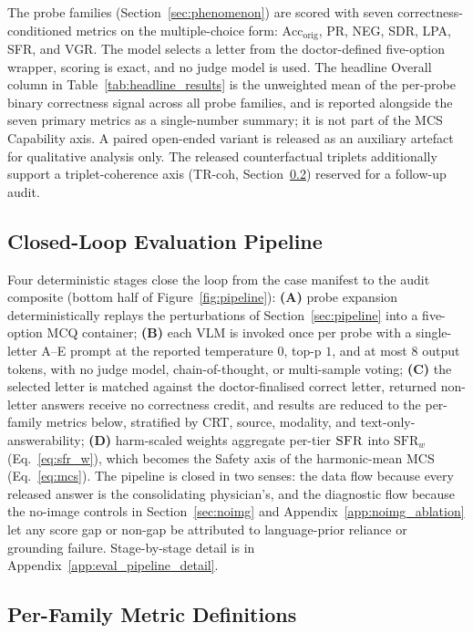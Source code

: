 \documentclass{article}
\newcommand{\sfr}{\textsc{SFR}}
\begin{document}
The probe families (Section~\ref{sec:phenomenon}) are scored with seven correctness-conditioned metrics on the multiple-choice form: $\mathrm{Acc}_{\mathrm{orig}}$, PR, NEG, SDR, LPA, \sfr, and VGR. The model selects a letter from the doctor-defined five-option wrapper, scoring is exact, and no judge model is used. The headline Overall column in Table~\ref{tab:headline_results} is the unweighted mean of the per-probe binary correctness signal across all probe families, and is reported alongside the seven primary metrics as a single-number summary; it is not part of the MCS Capability axis. A paired open-ended variant is released as an auxiliary artefact for qualitative analysis only. The released counterfactual triplets additionally support a triplet-coherence axis (TR-coh, Section~\ref{sec:per_family_metrics}) reserved for a follow-up audit.

\subsection{Closed-Loop Evaluation Pipeline}
\label{sec:eval_pipeline}

Four deterministic stages close the loop from the case manifest to the audit composite (bottom half of Figure~\ref{fig:pipeline}): \textbf{(A)} probe expansion deterministically replays the perturbations of Section~\ref{sec:pipeline} into a five-option MCQ container; \textbf{(B)} each VLM is invoked once per probe with a single-letter A--E prompt at the reported temperature $0$, top-p $1$, and at most $8$ output tokens, with no judge model, chain-of-thought, or multi-sample voting; \textbf{(C)} the selected letter is matched against the doctor-finalised correct letter, returned non-letter answers receive no correctness credit, and results are reduced to the per-family metrics below, stratified by CRT, source, modality, and text-only-answerability; \textbf{(D)} harm-scaled weights aggregate per-tier $\sfr$ into $\mathrm{SFR}_w$ (Eq.~\ref{eq:sfr_w}), which becomes the Safety axis of the harmonic-mean MCS (Eq.~\ref{eq:mcs}). The pipeline is closed in two senses: the data flow because every released answer is the consolidating physician's, and the diagnostic flow because the no-image controls in Section~\ref{sec:noimg} and Appendix~\ref{app:noimg_ablation} let any score gap or non-gap be attributed to language-prior reliance or grounding failure. Stage-by-stage detail is in Appendix~\ref{app:eval_pipeline_detail}.

\subsection{Per-Family Metric Definitions}
\label{sec:per_family_metrics}
\end{document}
